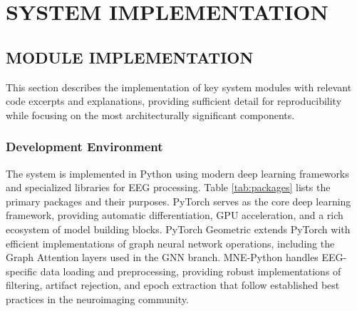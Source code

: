 
\chapter{SYSTEM IMPLEMENTATION}

\section{MODULE IMPLEMENTATION}

This section describes the implementation of key system modules with relevant code excerpts and explanations, providing sufficient detail for reproducibility while focusing on the most architecturally significant components.

\subsection{Development Environment}

The system is implemented in Python using modern deep learning frameworks and specialized libraries for EEG processing. Table \ref{tab:packages} lists the primary packages and their purposes. PyTorch serves as the core deep learning framework, providing automatic differentiation, GPU acceleration, and a rich ecosystem of model building blocks. PyTorch Geometric extends PyTorch with efficient implementations of graph neural network operations, including the Graph Attention layers used in the GNN branch. MNE-Python handles EEG-specific data loading and preprocessing, providing robust implementations of filtering, artifact rejection, and epoch extraction that follow established best practices in the neuroimaging community.

